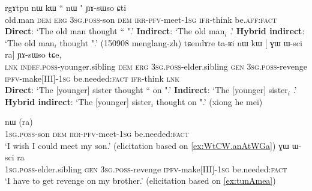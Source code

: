 \begin{exe}
\ex 
\begin{xlist}
\ex \label{ex:WtCW.anAtWGa}
\gll rgɤtpu nɯ kɯ `` nɯ " ɲɤ-sɯso ɕti \\
old.man \textsc{dem} \textsc{erg} \textsc{3sg}.\textsc{poss}-son \textsc{dem} \textsc{irr}-\textsc{pfv}-meet-\textsc{1sg} \textsc{ifr}-think be.\textsc{aff}:\textsc{fact} \\
\glt  \textbf{Direct}: `The old man thought `` ".'
\glt  \textbf{Indirect}:  `The old man$_i$ .'
\glt  \textbf{Hybrid indirect}:  `The old man$_i$ thought  ".' (150908 menglang-zh)
\ex \label{ex:tunAmea}
\gll tɕendɤre ta-ʁi nɯ kɯ [ ɣɯ ɯ-sci  ra] ɲɤ-sɯso tɕe, \\
\textsc{lnk}  \textsc{indef}.\textsc{poss}-younger.sibling \textsc{dem} \textsc{erg}  {\textsc{3sg}.\textsc{poss}-elder.sibling}  \textsc{gen} \textsc{3sg}.\textsc{poss}-revenge {\textsc{ipfv}-make[III]-\textsc{1sg}} be.needed:\textsc{fact} \textsc{ifr}-think \textsc{lnk} \\
\glt  \textbf{Direct}: `The [younger] sister thought `` on ".'
\glt  \textbf{Indirect}:  `The [younger] sister$_i$ .'
\glt  \textbf{Hybrid indirect}:  `The [younger] sister$_i$ thought  on ".' (xiong he mei)
\end{xlist}
\end{exe} 
\largerpage
\begin{exe}
\ex
\begin{xlist}
\ex \label{ex:WtCW.anAtWGa2}
\gll {} nɯ  (ra) \\
 \textsc{1sg}.\textsc{poss}-son \textsc{dem} \textsc{irr}-\textsc{pfv}-meet-\textsc{1sg} be.needed:\textsc{fact}\\
\glt `I wish I could meet my son.' (elicitation based on \ref{ex:WtCW.anAtWGa})
\ex \label{ex:tunAmea2}
\gll {} ɣɯ ɯ-sci  ra \\
 {\textsc{1sg}.\textsc{poss}-elder.sibling}  \textsc{gen} \textsc{3sg}.\textsc{poss}-revenge {\textsc{ipfv}-make[III]-\textsc{1sg}} be.needed:\textsc{fact}  \\
\glt `I have to get revenge on my brother.' (elicitation based on \ref{ex:tunAmea})
\end{xlist}
  \end{exe}
    
